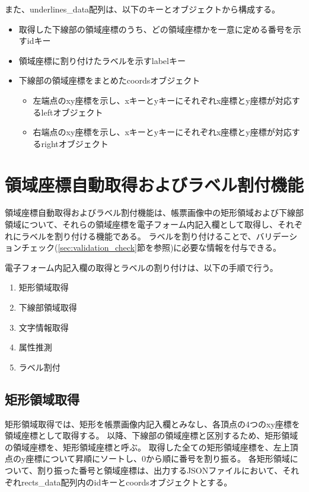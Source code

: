 また、underlines\_data配列は、以下のキーとオブジェクトから構成する。

\begin{itemize}
    \item 取得した下線部の領域座標のうち、どの領域座標かを一意に定める番号を示すidキー
    \item 領域座標に割り付けたラベルを示すlabelキー
    \item 下線部の領域座標をまとめたcoordsオブジェクト
    \begin{itemize}
        \item 左端点のxy座標を示し、xキーとyキーにそれぞれx座標とy座標が対応するleftオブジェクト
        \item 右端点のxy座標を示し、xキーとyキーにそれぞれx座標とy座標が対応するrightオブジェクト
    \end{itemize}
\end{itemize}

\section{領域座標自動取得およびラベル割付機能}\label{sec:eform_write_space_obtainment_feature}
領域座標自動取得およびラベル割付機能は、帳票画像中の矩形領域および下線部領域について、それらの領域座標を電子フォーム内記入欄として取得し、それぞれにラベルを割り付ける機能である。
ラベルを割り付けることで、バリデーションチェック(\ref{sec:validation_check}節を参照)に必要な情報を付与できる。

電子フォーム内記入欄の取得とラベルの割り付けは、以下の手順で行う。

\begin{enumerate}
    \item 矩形領域取得
    \item 下線部領域取得
    \item 文字情報取得
    \item 属性推測
    \item ラベル割付
\end{enumerate}

\subsection{矩形領域取得}\label{subsec:rect_coords_obtainment}
矩形領域取得では、矩形を帳票画像内記入欄とみなし、各頂点の4つのxy座標を領域座標として取得する。
以降、下線部の領域座標と区別するため、矩形領域の領域座標を、矩形領域座標と呼ぶ。
取得した全ての矩形領域座標を、左上頂点のy座標について昇順にソートし、0から順に番号を割り振る。
各矩形領域について、割り振った番号と領域座標は、出力するJSONファイルにおいて、それぞれrects\_data配列内のidキーとcoordsオブジェクトとする。

